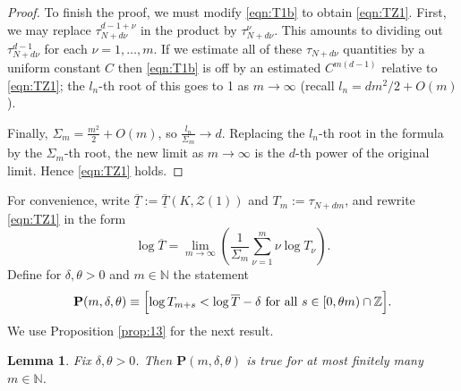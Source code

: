 \documentclass[12pt]{article}
\numberwithin{equation}{section}
\newtheorem{lemma}[theorem]{Lemma}
\newcommand{\Z}{\mathbb{Z}}
\newcommand{\N}{\mathbb{N}}
\newcommand{\calZ}{\mathcal{Z}}
\begin{document}
\begin{proof}
To finish the proof, we must modify \eqref{eqn:T1b} to obtain \eqref{eqn:TZ1}.  First, we may replace  $\tau_{N+d\nu}^{d-1+\nu}$ in the product by  $\tau_{N+d\nu}^{\nu}$. This amounts to dividing out $\tau_{N+d\nu}^{d-1}$ for each $\nu=1,\ldots,m$.  If we estimate all of these $\tau_{N+d\nu}$ quantities by a uniform constant $C$ then  \eqref{eqn:T1b} is off by an estimated $C^{m(d-1)}$  relative to \eqref{eqn:TZ1}; the $l_n$-th root of this goes to 1 as $m\to\infty$  (recall $l_n=dm^2/2+O(m)$).  

Finally,  $\Sigma_m= \frac{m^2}{2}+O(m)$, so $\frac{l_n}{\Sigma_m}\to d$.  Replacing the $l_n$-th root in the formula by the $\Sigma_m$-th root,  the new limit as $m\to\infty$ is the $d$-th power of the original limit.  Hence \eqref{eqn:TZ1} holds.  
\end{proof}


For convenience, write $\overline{\underline T}:=\overline{\underline T}(K,\calZ(1))$ and $T_m:=\tau_{N+dm}$, and rewrite \eqref{eqn:TZ1} in the form \def\sT{\overline T}
\begin{equation}\label{eqn:logTZ1}
\log\sT = \lim_{m\to\infty}\left(\frac{1}{\Sigma_m}\sum_{\nu=1}^m \nu\log T_{\nu}\right).
\end{equation}
\def\bP{\mathbf{P}}
Define for $\delta,\theta>0$ and $m\in \N$ the statement
\begin{equation*}
\bP(m,\delta,\theta)\equiv \Bigl[ \log T_{m+s}<\log\sT -\delta \hbox{ for all } s\in[0,\theta m)\cap \Z \Bigr].  
\end{equation*}
We use Proposition \ref{prop:13} for the next result.

\begin{lemma}
Fix $\delta,\theta>0$.  Then $\bP(m,\delta,\theta)$ is true for at most finitely many $m\in \N$.  
\end{lemma}
\end{document}
